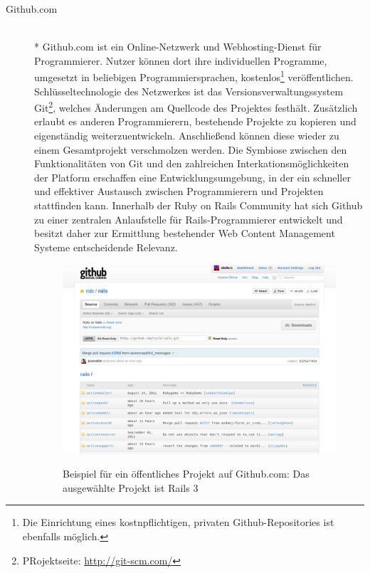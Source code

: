 \begin{description}
\newpage
\item[Github.com]\mbox{~}\\*
Github.com ist ein Online-Netzwerk und Webhosting-Dienst für Programmierer. Nutzer können dort ihre individuellen Programme, umgesetzt in beliebigen Programmiersprachen, kostenlos\footnote{Die Einrichtung eines kostnpflichtigen, privaten Github-Repositories ist ebenfalls möglich.}  veröffentlichen.
Schlüsseltechnologie des Netzwerkes ist das Versionsverwaltungssystem Git\footnote{PRojektseite: \href{http://git-scm.com/}{http://git-scm.com/}}, welches Änderungen am Quellcode des Projektes festhält. Zusätzlich erlaubt es anderen Programmierern, bestehende Projekte zu kopieren und eigenständig weiterzuentwickeln. Anschließend können diese wieder zu einem Gesamtprojekt verschmolzen werden.
Die Symbiose zwischen den Funktionalitäten von Git und den zahlreichen Interkationsmöglichkeiten der Platform erschaffen eine Entwicklungsumgebung, in der ein schneller und effektiver Austausch zwischen Programmierern und Projekten stattfinden kann.
Innerhalb der Ruby on Rails Community hat sich Github zu einer zentralen Anlaufstelle für Rails-Programmierer entwickelt und besitzt daher zur Ermittlung bestehender Web Content Management Systeme entscheidende Relevanz.
\begin{figure}[!h]
\begin{center}
\label{fig.github}
\includegraphics[scale=0.3]{images/analyse/github/github.png}
\caption{Beispiel für ein öffentliches Projekt auf Github.com: Das ausgewählte Projekt ist Rails 3}
\end{center}
\end{figure}
\end{description}

